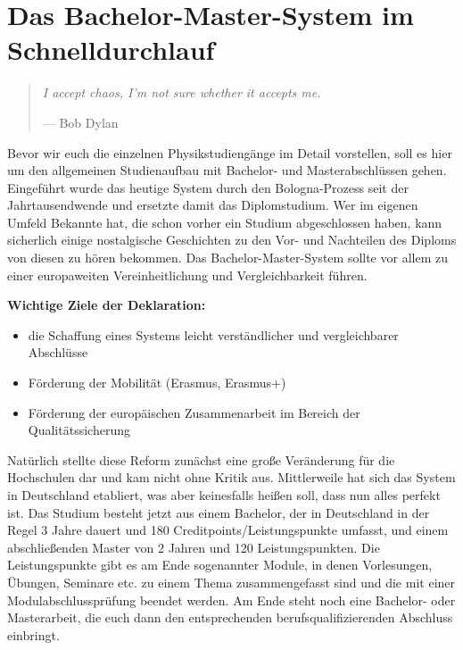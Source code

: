 \section{Das Bachelor-Master-System im Schnelldurchlauf}

\begin{multicols}{2}
\begin{quote}
	\textit{\foreignlanguage{english}{I accept chaos, I'm not sure whether it accepts me.}}

	\hfill--- Bob Dylan
\end{quote}
Bevor wir euch die einzelnen Physikstudiengänge im Detail vorstellen, soll es hier um den allgemeinen Studienaufbau mit Bachelor- und Masterabschlüssen gehen.
Eingeführt wurde das heutige System durch den Bologna-Prozess seit der Jahrtausendwende und ersetzte damit das Diplomstudium. Wer im eigenen Umfeld Bekannte hat, die schon vorher ein Studium abgeschlossen haben, kann sicherlich einige nostalgische Geschichten zu den Vor- und Nachteilen des Diploms von diesen zu hören bekommen.
Das Bachelor-Master-System sollte vor allem zu einer europaweiten Vereinheitlichung und Vergleichbarkeit führen.

\textbf{Wichtige Ziele der Deklaration:}
\begin{itemize}
	\item die Schaffung eines Systems leicht verständlicher und vergleichbarer Abschlüsse
	\item Förderung der Mobilität (Erasmus, Erasmus+)
	\item Förderung der europäischen Zusammenarbeit im Bereich der Qualitätssicherung
\end{itemize}

Natürlich stellte diese Reform zunächst eine große Veränderung für die Hochschulen dar und kam nicht ohne Kritik aus. Mittlerweile hat sich das System in Deutschland etabliert, was aber keinesfalls heißen soll, dass nun alles perfekt ist. Das Studium besteht jetzt aus einem Bachelor, der in Deutschland in der Regel 3 Jahre dauert und 180 Creditpoints/Leistungspunkte umfasst, und einem abschließenden Master von 2 Jahren und 120 Leistungspunkten. Die Leistungspunkte gibt es am Ende sogenannter Module, in denen Vorlesungen, Übungen, Seminare etc. zu einem Thema zusammengefasst sind und die mit einer Modulabschlussprüfung beendet werden. Am Ende steht noch eine Bachelor- oder Masterarbeit, die euch dann den entsprechenden berufsqualifizierenden Abschluss einbringt. 


\end{multicols}
